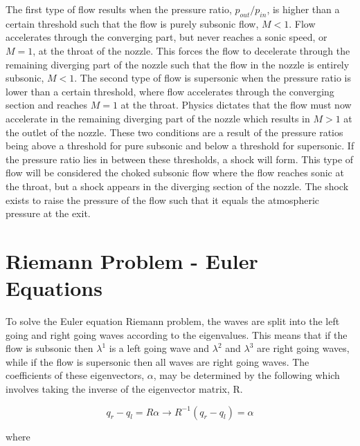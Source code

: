 \documentclass{article}%
\numberwithin{equation}{section}
\begin{document}
The first type of flow results when the pressure ratio, $p_{out} / p_{in}$, is higher than a certain threshold such that the flow is purely subsonic flow, $M < 1$. Flow accelerates through the converging part, but never reaches a sonic speed, or $M = 1$, at the throat of the nozzle. This forces the flow to decelerate through the remaining diverging part of the nozzle such that the flow in the nozzle is entirely subsonic, $M < 1$. The second type of flow is supersonic when the pressure ratio is lower than a certain threshold, where flow accelerates through the converging section and reaches $M = 1$ at the throat. Physics dictates that the flow must now accelerate in the remaining diverging part of the nozzle which results in $M > 1$ at the outlet of the nozzle. These two conditions are a result of the pressure ratios being above a threshold for pure subsonic and below a threshold for supersonic. If the pressure ratio lies in between these thresholds, a shock will form. This type of flow will be considered the choked subsonic flow where the flow reaches sonic at the throat, but a shock appears in the diverging section of the nozzle. The shock exists to raise the pressure of the flow such that it equals the atmospheric pressure at the exit.

\section{Riemann Problem - Euler Equations}
To solve the Euler equation Riemann problem, the waves are split into the left going and right going waves according to the eigenvalues. This means that if the flow is subsonic then $\lambda^1$ is a left going wave and $\lambda^2$ and $\lambda^3$ are right going waves, while if the flow is supersonic then all waves are right going waves. The coefficients of these eigenvectors, $\alpha$, may be determined by the following which involves taking the inverse of the eigenvector matrix, R.

\begin{equation}
q_r - q_l = R \alpha \rightarrow R^{-1} (q_r - q_l) = \alpha \label{alphaeqn}
\end{equation}

where 
\end{document}
